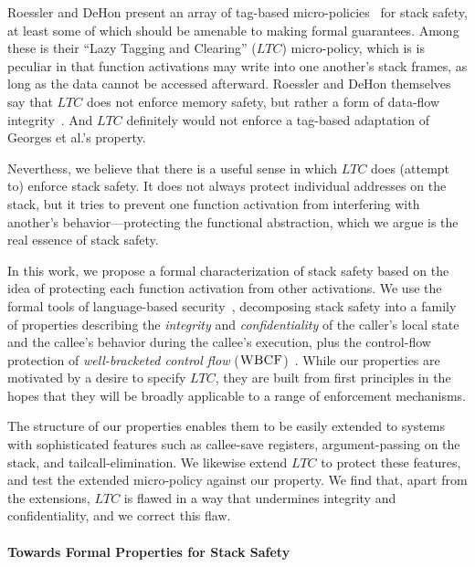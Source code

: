 \documentclass[10pt,conference]{ieeetran}%
\theoremstyle{definition}
\begin{document}
Roessler and DeHon \cite{DBLP:conf/sp/RoesslerD18} present an array of tag-based
micro-policies~\cite{pump_oakland2015} for stack safety, at least some of which should be amenable to making
formal guarantees. Among these is their ``Lazy Tagging and Clearing'' (\(LTC\)) micro-policy,
which is is peculiar in that function activations may write into one another's stack frames,
as long as the data cannot be accessed afterward. Roessler and DeHon themselves say that
\(LTC\) does not enforce memory safety, but rather a form of data-flow integrity~\cite{castro+06}.
And \(LTC\) definitely would not enforce a tag-based adaptation of Georges et al.'s property.

Neverthess, we believe that there is a useful sense in which \(LTC\) does (attempt to) enforce stack safety. 
It does not always protect individual addresses on the stack, but it tries to 
prevent one function activation from interfering with another's behavior---protecting 
the functional abstraction, which we argue is the real essence of stack safety.

In this work, we propose a formal characterization of stack safety based on the idea
of protecting each function activation from other activations.
We use the formal tools of language-based
security~\cite{sabelfeld2003language}, decomposing stack safety into a family of
properties describing
the {\em integrity} and {\em confidentiality} of the caller’s local state
and the callee's behavior during the callee's execution, plus the control-flow protection
of {\em well-bracketed control flow} (\(\textnormal{\sc WBCF}\))~\cite{SkorstengaardSTKJFP}.
While our properties are motivated by a desire to specify \(LTC\), 
they are built from first principles in the hopes that they will be broadly applicable
to a range of enforcement mechanisms.

The structure of our properties enables them to be easily extended to systems with
sophisticated features such as callee-save registers, argument-passing on the stack,
and tailcall-elimination. We likewise extend \(LTC\) to protect these features, and
test the extended micro-policy against our property. We find that, apart from the extensions, \(LTC\)
is flawed in a way that undermines integrity and confidentiality, and we correct
this flaw.

\paragraph*{Towards Formal Properties for Stack Safety}
\end{document}
